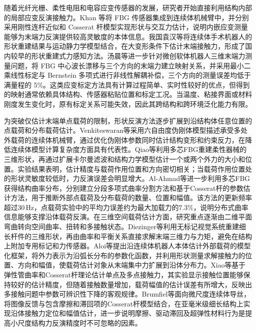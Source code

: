 随着光纤光栅、柔性电阻和电容应变传感器的发展，研究者开始直接利用结构内部的局部应变反演接触力。Khan 等将 FBG 传感器集成到连续体机械臂中，并分别采用刚性连杆近似和 Cosserat 杆模型实现形状与交互力估计，说明内嵌应变测量能够为末端力反演提供较高灵敏度的本体信息\cite{khan2017force}。我国袁汉等将连续体手术机器人的形状重建结果与运动静力学模型结合，在大变形条件下估计末端接触力，形成了国内较早的形状重建式力感知方法\cite{yuan2017shape}。汤晨等进一步针对微创软体机器人三维末端力测量问题，将 FBG 中心波长漂移与三个方向的末端力建立映射关系，并采用最小二乘线性标定与 Bernstein 多项式进行非线性解耦补偿，三个方向的测量误差均低于满量程的 5\%\cite{汤晨2021基于光纤光栅的软体机器人末端力测量方法研究}。这类应变标定方法具有计算过程简单、实时性较好的优点，但得到的映射通常依赖具体结构、传感器粘贴位置和标定工况。当温度、粘接界面或材料刚度发生变化时，原有标定关系可能失效，因此其跨结构和跨环境泛化能力有限。

为突破仅估计末端单点载荷的限制，形状反演方法逐步扩展到沿结构体任意位置的点载荷和分布载荷估计。Venkiteswaran等采用六自由度伪刚体模型描述承受多处外载荷的连续体机械臂，通过优化伪刚体参数同时估计结构变形和约束反力，在降低连续体模型计算复杂度方面具有代表性\cite{venkiteswaran2019shape}。Qiao等利用多芯FBG重建柔性器械的三维形状，再通过扩展卡尔曼滤波和结构力学模型估计一个或两个外力的大小和位置\cite{qiao2021force}。实验结果表明，估计精度与载荷作用位置和方向密切相关；当载荷作用位置处的形状灵敏度较低时，力反演误差会明显增大。Al-Ahmad等进一步利用多芯FBG获得结构曲率分布，分别建立分段多项式曲率分割方法和基于Cosserat杆的参数估计方法，用于推断外部点载荷及分布载荷的数量、位置和幅值。该方法的更新频率超过$30\,\mathrm{Hz}$，点载荷实验中的平均力误差约为最大加载力的$7.3\%$，说明分布式曲率信息能够支撑沿体载荷反演\cite{al2021fbg}。在三维空间载荷估计方面，研究重点逐渐由二维平面弯曲转向空间曲率、扭转和多接触状态。Diezinger等利用无标记视觉系统重建细长杆件的三维形状，再由曲率和平衡关系直接求解末端三维力与力矩，避免在结构上附加专用标记和力传感器\cite{diezinger2022curvature}。Aloi等提出沿连续体机器人本体估计外部载荷的模型化框架，将外力表示为沿弧长分布的参数化函数，并利用形状测量求解接触力的位置、方向和幅值，使载荷估计对象从末端集中力扩展到沿体分布力\cite{aloi2022estimating}。Xiao等基于弹性管曲率和Cosserat杆理论估计单点及多点接触力，其实验显示接触位置能够保持较好的估计精度，但随着接触数量增加，载荷幅值的估计误差有所增大，反映出多接触问题中参数可辨识性下降的客观规律\cite{xiao2023curvature}。Brumfiel等面向微尺度连续体导丝，将图像反馈与包含摩擦和滞回项的Cosserat杆模型结合，在亚毫米级细长结构上实现沿体接触力定位和幅值估计，进一步说明摩擦、驱动滞回及超弹性材料行为是提高小尺度结构力反演精度时不可忽略的因素\cite{brumfiel2024image}。

